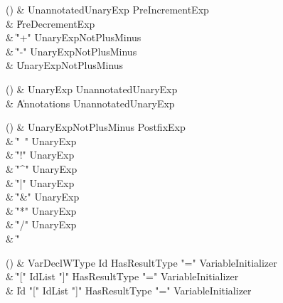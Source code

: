 \begin{bbgrammarappendix}{3.1in}

() & UnannotatedUnaryExp \label{prod:UnannotatedUnaryExp}  \: PreIncrementExp  \\

 &    \| PreDecrementExp \\
 &    \| \xcd"+" UnaryExpNotPlusMinus \\
 &    \| \xcd"-" UnaryExpNotPlusMinus \\
 &    \| UnaryExpNotPlusMinus \\

\end{bbgrammarappendix}

\begin{bbgrammarappendix}{4.2in}

() & UnaryExp \label{prod:UnaryExp}  \: UnannotatedUnaryExp  \\

 &    \| Annotations UnannotatedUnaryExp \\

\end{bbgrammarappendix}

\begin{bbgrammarappendix}{3.0in}

() & UnaryExpNotPlusMinus \label{prod:UnaryExpNotPlusMinus}  \: PostfixExp  \\

 &    \| \xcd"~" UnaryExp \\
 &    \| \xcd"!" UnaryExp \\
 &    \| \xcd"^" UnaryExp \\
 &    \| \xcd"|" UnaryExp \\
 &    \| \xcd"&" UnaryExp \\
 &    \| \xcd"*" UnaryExp \\
 &    \| \xcd"/" UnaryExp \\
 &    \| \xcd"%

\end{bbgrammarappendix}

\begin{bbgrammarappendix}{3.8in}

() & VarDeclWType \label{prod:VarDeclWType}  \: Id HasResultType \xcd"=" VariableInitializer  \\

 &    \| \xcd"[" IdList \xcd"]" HasResultType \xcd"=" VariableInitializer \\
 &    \| Id \xcd"[" IdList \xcd"]" HasResultType \xcd"=" VariableInitializer \\

\end{bbgrammarappendix}

